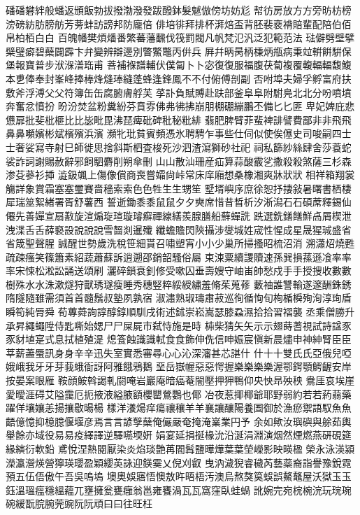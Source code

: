 磻磻礬絆般蟠返頒飯勃拔撥渤潑發跋醱鉢髮魃倣傍坊妨尨
幇彷房放⽅方旁昉枋榜滂磅紡肪膀舫芳蒡蚌訪謗邦防龐倍
俳培徘拜排杯湃焙盃背胚裴裵褙賠輩配陪伯佰帛柏栢⽩白
百魄幡樊煩燔番繁蕃藩飜伐筏罰閥凡帆梵氾汎泛犯範范法
琺僻劈壁擘檗璧癖碧蘗闢霹卞弁變辨辯邊別瞥鱉鼈丙倂兵
屛幷昞昺柄棅炳甁病秉竝輧餠騈保堡報寶普步洑湺潽珤甫
菩補褓譜輔伏僕匐⼘卜宓復復服福腹茯蔔複覆輹輻輻馥鰒
本乶俸奉封峯峰捧棒烽熢琫縫蓬蜂逢鋒鳳不不付俯傅剖副
否咐埠夫婦孚孵富府扶敷斧浮溥⽗父符簿⽸缶腐腑膚艀芙
莩訃負賦賻赴趺部釜⾩阜附駙鳧北北分吩噴墳奔奮忿憤扮
昐汾焚盆粉糞紛芬賁雰佛弗彿拂崩朋棚硼繃鵬丕備⼔匕匪
卑妃婢庇悲憊扉批斐枇榧⽐比毖毗毘沸琵痺砒碑秕秘粃緋
翡肥脾臂菲蜚裨誹譬費鄙⾮非⾶飛⿐鼻嚬嬪彬斌檳殯浜濱
瀕牝玭貧賓頻憑氷聘騁乍事些仕伺似使俟僿史司唆嗣四⼠
士奢娑寫寺射巳師徙思捨斜斯柶査梭死沙泗渣瀉獅砂社祀
祠私篩紗絲肆舍莎蓑蛇裟詐詞謝賜赦辭邪飼駟麝削朔傘刪
⼭山散汕珊産疝算蒜酸霰乷撒殺殺煞薩三杉森渗芟蔘衫揷
澁鈒颯上傷像償商喪嘗孀尙峠常床庠廂想桑橡湘爽牀狀狀
相祥箱翔裳觴詳象賞霜塞塞璽賽嗇穡索索⾊色牲⽣生甥笙
墅壻嶼序庶徐恕抒捿敍暑曙書栖棲犀瑞筮絮緖署胥舒薯西
誓逝鋤⿉黍⿏鼠⼣夕奭席惜昔晳析汐淅潟⽯石碩蓆釋錫仙
僊先善嬋宣扇敾旋渲煽琁瑄璇璿癬禪線繕羨腺膳船蘚蟬詵
跣選銑鐥饍鮮卨屑楔泄洩渫⾆舌薛褻設說說說雪齧剡暹殲
纖蟾贍閃陝攝涉燮城姓宬性惺成星晟猩珹盛省省筬聖聲腥
誠醒世勢歲洗稅笹細貰召嘯塑宵⼩小少巢所掃搔昭梳沼消
溯瀟炤燒甦疏疎瘙笑篠簫素紹蔬蕭蘇訴逍遡邵銷韶騷俗屬
束涑粟續謖贖速孫巽損蓀遜飡率率率宋悚松淞訟誦送頌刷
灑碎鎖衰釗修受嗽囚垂壽嫂守岫峀帥愁戍⼿手授搜收數數
樹殊⽔水洙漱燧狩獸琇璲瘦睡秀穗竪粹綏綬繡羞脩茱蒐蓚
藪袖誰讐輸遂邃酬銖銹隋隧隨雖需須⾸首髓鬚叔塾夙孰宿
淑潚熟琡璹肅菽巡徇循恂旬栒楯橓殉洵淳珣盾瞬筍純脣舜
荀蓴蕣詢諄醇錞順馴戌術述鉥崇崧嵩瑟膝蝨濕拾拾習褶襲
丞乘僧勝升承昇繩蠅陞侍匙嘶始媤⼫尸屎屍市弑恃施是時
枾柴猜⽮矢⽰示翅蒔蓍視試詩諡⾗豕豺埴寔式息拭植殖湜
熄篒蝕識識軾⾷食飾伸侁信呻娠宸愼新晨燼申神紳腎⾂臣
莘薪藎蜃訊⾝身⾟辛迅失室實悉審尋⼼心沁深瀋甚芯諶什
什⼗十雙⽒氏亞俄兒啞娥峨我⽛牙芽莪蛾衙訝阿雅餓鴉鵝
堊岳嶽幄惡惡愕握樂樂樂樂渥鄂鍔顎鰐齷安岸按晏案眼雁
鞍顔鮟斡謁軋閼唵岩巖庵暗癌菴闇壓押狎鴨仰央怏昻殃秧
鴦厓哀埃崖愛曖涯碍艾隘靄厄扼掖液縊腋額櫻罌鶯鸚也倻
冶夜惹揶椰爺耶野弱約若若葯蒻藥躍佯壤孃恙揚攘敭暘楊
樣洋瀁煬痒瘍禳穰⽺羊襄讓釀陽養圄御於漁瘀禦語馭⿂魚
齬億憶抑檍臆偃堰彦焉⾔言諺孼蘖俺儼嚴奄掩淹嶪業円予
余如歟汝璵礖與艅茹輿轝餘亦域役易易疫繹譯逆驛嚥堧姸
娟宴延捐挻椽沇沿涎涓淵演烟然煙燃燕硏硯筵緣縯衍軟鉛
鳶悅涅熱閱厭染炎焰琰艶苒閻髥鹽曄燁葉葉塋嶸影映暎楹
榮永泳渶潁濚瀛瀯煐營獰瑛瓔盈穎纓英詠迎鍈霙乂倪刈叡
曳汭濊猊睿穢芮藝蘂裔詣譽豫銳霓預五伍俉傲午吾吳嗚塢
墺奧娛寤悟懊敖旿晤梧汚澳烏熬獒筽蜈誤鰲鼇屋沃獄⽟玉
鈺溫瑥瘟穩縕蘊兀壅擁瓮甕癰翁邕雍饔渦⽡瓦窩窪臥蛙蝸
訛婉完宛梡椀浣玩琓琬碗緩翫脘腕莞豌阮阮頑⽈曰往旺枉
